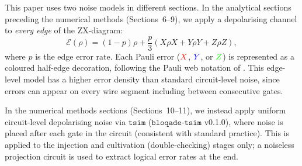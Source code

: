 \documentclass[a4paper,onecolumn,11pt,accepted=2026-06-10]{quantumarticle}
\begin{document}
This paper uses two noise models in different sections. In the analytical sections preceding the numerical methods (Sections~6--9), we apply a depolarising channel to \textit{every edge} of the ZX-diagram:
\begin{equation*}
    \mathcal{E}(\rho) = (1-p)\rho + \frac{p}{3}(X\rho X + Y\rho Y + Z\rho Z),
\end{equation*}
where $p$ is the edge error rate. Each Pauli error (${\color{red}X}$, ${\color{blue}Y}$, or ${\color{green}Z}$) is represented as a coloured half-edge decoration, following the Pauli web notation of \cite{Bombin_2024}. This edge-level model has a higher error density than standard circuit-level noise, since errors can appear on every wire segment including between consecutive gates.

In the numerical methods sections (Sections~10--11), we instead apply uniform circuit-level depolarising noise via $\mathtt{tsim}$ \cite{QuEraComputing_tsim_2026} ($\mathtt{bloqade\text{-}tsim}$ v0.1.0), where noise is placed after each gate in the circuit (consistent with standard practice). This is applied to the injection and cultivation (double-checking) stages only; a noiseless projection circuit is used to extract logical error rates at the end.
\end{document}
